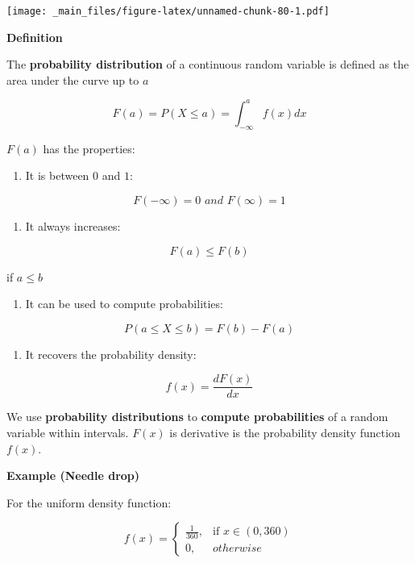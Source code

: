 \documentclass[
]{book}
\providecommand{\tightlist}{%
  \setlength{\itemsep}{0pt}\setlength{\parskip}{0pt}}
\begin{document}
\texttt{[image: \_main\_files/figure-latex/unnamed-chunk-80-1.pdf]}

\textbf{Definition}

The \textbf{probability distribution} of a continuous random variable is defined as the area under the curve up to \(a\)

\[F(a)=P(X\leq a) =\int_{-\infty} ^a f(x)dx\]

\(F(a)\) has the properties:

\begin{enumerate}
\def\labelenumi{\arabic{enumi})}
\tightlist
\item
  It is between \(0\) and \(1\):
\end{enumerate}

\[F(-\infty)= 0 \,\, and \,\,F(\infty)=1\]

\begin{enumerate}
\def\labelenumi{\arabic{enumi})}
\setcounter{enumi}{1}
\tightlist
\item
  It always increases:
\end{enumerate}

\[F(a)\leq F(b)\]

if \(a\leq b\)

\begin{enumerate}
\def\labelenumi{\arabic{enumi})}
\setcounter{enumi}{2}
\tightlist
\item
  It can be used to compute probabilities:
\end{enumerate}

\[P(a \leq X \leq b)=F(b)-F(a)\]

\begin{enumerate}
\def\labelenumi{\arabic{enumi})}
\setcounter{enumi}{3}
\tightlist
\item
  It recovers the probability density:
\end{enumerate}

\[f(x)=\frac{dF(x)}{dx}\]

We use \textbf{probability distributions} to \textbf{compute probabilities} of a random variable within intervals. \(F(x)\) is derivative is the probability density function \(f(x)\).

\textbf{Example (Needle drop)}

For the uniform density function:

\[
    f(x)= 
\begin{cases}
    \frac{1}{360},& \text{if } x\in (0,360)\\
    0,& otherwise 
\end{cases}
\]
\end{document}
